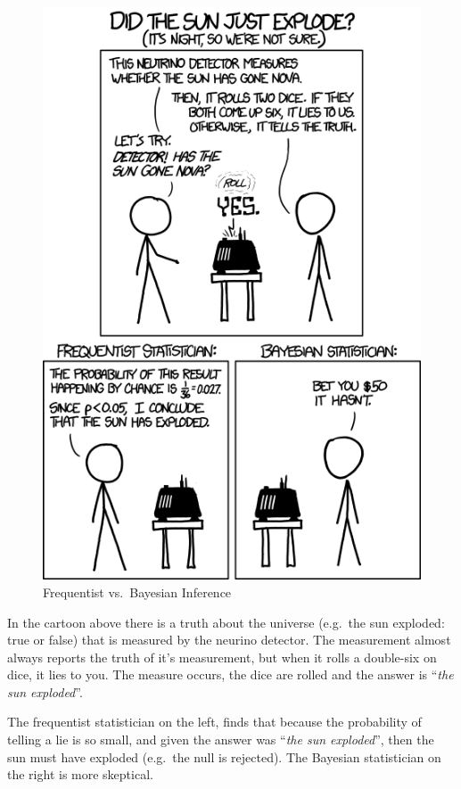 \documentclass[
]{book}
\begin{document}
\begin{figure}
\centering
\includegraphics{images/frequentists_vs_bayesians.png}
\caption{\label{fig:unnamed-chunk-3}Frequentist vs.~Bayesian Inference}
\end{figure}

In the cartoon above there is a truth about the universe (e.g.~the sun exploded: true or false) that is measured by the neurino detector. The measurement almost always reports the truth of it's measurement, but when it rolls a double-six on dice, it lies to you. The measure occurs, the dice are rolled and the answer is ``\emph{the sun exploded}''.

The frequentist statistician on the left, finds that because the probability of telling a lie is so small, and given the answer was ``\emph{the sun exploded}'', then the sun must have exploded (e.g.~the null is rejected). The Bayesian statistician on the right is more skeptical.
\end{document}
